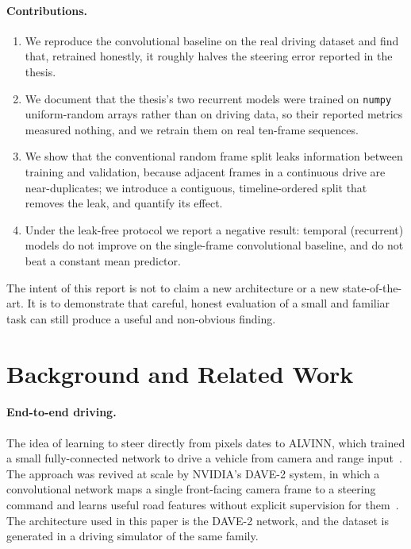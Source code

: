 \documentclass[11pt]{article}
\begin{document}
\paragraph{Contributions.}
\begin{enumerate}
  \item We reproduce the convolutional baseline on the real driving dataset and
        find that, retrained honestly, it roughly halves the steering error
        reported in the thesis.
  \item We document that the thesis's two recurrent models were trained on
        \texttt{numpy} uniform-random arrays rather than on driving data, so their
        reported metrics measured nothing, and we retrain them on real ten-frame
        sequences.
  \item We show that the conventional random frame split leaks information between
        training and validation, because adjacent frames in a continuous drive are
        near-duplicates; we introduce a contiguous, timeline-ordered split that
        removes the leak, and quantify its effect.
  \item Under the leak-free protocol we report a negative result: temporal
        (recurrent) models do not improve on the single-frame convolutional
        baseline, and do not beat a constant mean predictor.
\end{enumerate}

The intent of this report is not to claim a new architecture or a new
state-of-the-art. It is to demonstrate that careful, honest evaluation of a small
and familiar task can still produce a useful and non-obvious finding.

\section{Background and Related Work}

\paragraph{End-to-end driving.}
The idea of learning to steer directly from pixels dates to ALVINN, which trained a
small fully-connected network to drive a vehicle from camera and range
input~\mbox{\citep{pomerleau1989alvinn}}. The approach was revived at scale by NVIDIA's
DAVE-2 system, in which a convolutional network maps a single front-facing camera
frame to a steering command and learns useful road features without explicit
supervision for them~\mbox{\citep{bojarski2016end}}. The architecture used in this paper is
the DAVE-2 network, and the dataset is generated in a driving simulator of the same
family.
\end{document}
